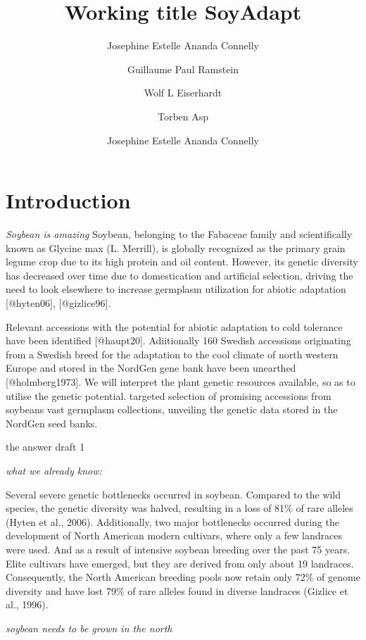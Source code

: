 \documentclass[9pt,twocolumn,twoside,lineno]{gsajnl}
\title{Working title SoyAdapt}
\author[1,$\dagger$,$\ast$]{Josephine Estelle Ananda Connelly}
\author[2]{Guillaume Paul Ramstein}
\author[3]{Wolf L Eiserhardt}
\author[4]{Torben Asp}
\author[5]{Josephine Estelle Ananda Connelly}
\affil[1]{Centre for Quantitative Genetics and Genomics, Faculty of Technical Sciences, Aarhus University (DK).}
\affil[2]{Department of Biology, Faculty of Natural Sciences, Aarhus University, (DK).}
\affil[3]{Royal Botanic Gardens, Kew, (UK).}
\begin{document}
\maketitle
\thispagestyle{firststyle}
\vspace{-13pt}%


\section{Introduction}

\textit{Soybean is amazing}
Soybean, belonging to the Fabaceae family and scientifically known as Glycine max (L. Merrill), is globally recognized as the primary grain legume crop due to its high protein and oil content. However, its genetic diversity has decreased over time due to domestication and artificial selection, driving the need to look elsewhere to increase germplasm utilization for abiotic adaptation [@hyten06], [@gizlice96]. 

Relevant accessions with the potential for abiotic adaptation to cold tolerance have been identified [@haupt20]. Adiitionally 160 Swedish accessions originating from a Swedish breed for the adaptation to the cool climate of north western Europe and stored in the NordGen gene bank have been unearthed [@holmberg1973]. 
We will interpret the plant genetic resources available, so as to utilise the genetic potential. targeted selection of promising accessions from soybeans vast germplasm collections, unveiling the genetic data stored in the NordGen seed banks.

the answer draft 1


\textit{what we already know:}

Several severe genetic bottlenecks occurred in soybean. Compared to the wild species, the genetic diversity was halved, resulting in a loss of 81\% of rare alleles (Hyten et al., 2006). Additionally, two major bottlenecks occurred during the development of North American modern cultivars, where only a few landraces were used. And as a result of intensive soybean breeding over the past 75 years. Elite cultivars have emerged, but they are derived from only about 19 landraces. Consequently, the North American breeding pools now retain only 72\% of genome diversity and have lost 79\% of rare alleles found in diverse landraces (Gizlice et al., 1996).


\textit{soybean needs to be grown in the north}
\end{document}
